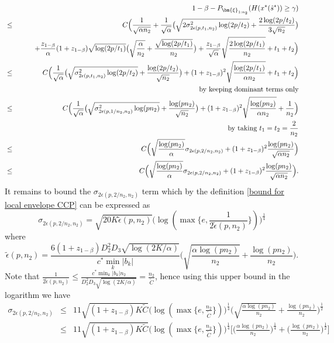 \documentclass[mnsc,blindrev]{informs4} %
\begin{document}
\begin{eqnarray*}
&&1-\beta-P_{\bm{\xi}_{1:n_2}}(H(x^*(\hat s^*))\geq \gamma)\\
&\leq&C\Big(\frac{1}{\sqrt{\alpha n_2}}+\frac{1}{\sqrt{\alpha}}\big(\sqrt{2\sigma^2_{2\epsilon(p,t_1,n_2)}\log(2p/t_2)}+\frac{2\log(2p/t_2)}{3\sqrt{n_2}}\big)\\
&&\hspace{5ex}+\frac{z_{1-\beta}}{\alpha}(1+z_{1-\beta})\sqrt{\log (2p/t_1)}\big(\sqrt{\frac{\alpha}{n_2}}+\frac{\sqrt{\log (2p/t_1)}}{n_2}\big)+\frac{z_{1-\beta}}{\sqrt{\alpha}}\sqrt{\frac{2\log(2p/t_1)}{n_2}}+t_1+t_2\Big)\\
&\leq&C\Big(\frac{1}{\sqrt{\alpha}}\big(\sqrt{\sigma^2_{2\epsilon(p,t_1,n_2)}\log(2p/t_2)}+\frac{\log(2p/t_2)}{\sqrt{n_2}}\big)+(1+z_{1-\beta})^2\sqrt{\frac{\log(2p/t_1)}{\alpha n_2}}+t_1+t_2\Big)\\
&&\text{\ \  by keeping dominant terms only}\\
&\leq&C\Big(\frac{1}{\sqrt{\alpha}}\big(\sqrt{\sigma^2_{2\epsilon(p,1/n_2,n_2)}\log(pn_2)}+\frac{\log(pn_2)}{\sqrt{n_2}}\big)+(1+z_{1-\beta})^2\sqrt{\frac{\log(pn_2)}{\alpha n_2}}+\frac{1}{n_2}\Big)\\
&&\text{\ \  by taking }t_1=t_2=\frac{2}{n_2}\\
&\leq&C\Big(\sqrt{\frac{\log(pn_2)}{\alpha}}\sigma_{2\epsilon(p,2/n_2,n_2)}+(1+z_{1-\beta})^2\frac{\log(pn_2)}{\sqrt{\alpha n_2}}\Big)\\
&\leq&C\Big(\sqrt{\frac{\log(pn_2)}{\alpha}}\sigma_{2\epsilon(p,2/n_2,n_2)}+(1+z_{1-\beta})^2\frac{\log(pn_2)}{\sqrt{\alpha n_2}}\Big).
\end{eqnarray*}
It remains to bound the $\sigma_{2\epsilon(p,2/n_2,n_2)}$ term which by the definition \eqref{bound for local envelope CCP} can be expressed as
\begin{equation*}
    \sigma_{2\epsilon(p,2/n_2,n_2)} = \sqrt{20K\tilde \epsilon(p,n_2)}\big(\log(\max\{e,\frac{1}{2\tilde \epsilon(p,n_2)}\})\big)^{\frac{1}{4}}
\end{equation*}
where
\begin{equation*}
\tilde \epsilon(p,n_2)=\frac{6(1+z_{1-\beta})D_2^2D_3\sqrt{\log(2K/\alpha)}}{c^*\min_k\lvert b_k\rvert}\big( \sqrt{\frac{\alpha \log(pn_2)}{n_2}}+\frac{\log(pn_2)}{n_2}\big).
\end{equation*}
Note that $\frac{1}{2\tilde \epsilon(p,n_2)}\leq \frac{c^*\min_k\lvert b_k\rvert  n_2}{D_2^2D_3\sqrt{\log(2K/\alpha)}}=\frac{n_2}{\tilde C}$, hence using this upper bound in the logarithm we have
\begin{eqnarray*}
    \sigma_{2\epsilon(p,2/n_2,n_2)} &\leq&11\sqrt{(1+z_{1-\beta})K\tilde C}\big(\log(\max\big\{e,\frac{n_2}{\tilde C}\big\})\big)^{\frac{1}{4}}\big( \sqrt{\frac{\alpha \log(pn_2)}{n_2}}+\frac{\log(pn_2)}{n_2}\big)^{\frac{1}{2}}\\
    &\leq&11\sqrt{(1+z_{1-\beta})K\tilde C}\big(\log(\max\big\{e,\frac{n_2}{\tilde C}\big\})\big)^{\frac{1}{4}}\big[\big(\frac{\alpha \log(pn_2)}{n_2}\big)^{\frac{1}{4}}+\big(\frac{\log(pn_2)}{n_2}\big)^{\frac{1}{2}}\big]
\end{eqnarray*}
\end{document}
